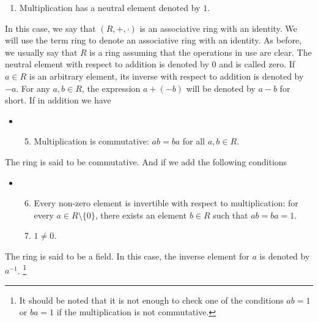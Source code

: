 \begin{definition}
\begin{itemize}
\begin{enumerate}
\item Multiplication has a neutral element denoted by $1$.
\end{enumerate}
\end{itemize}
In this case, we say that $(R, +, \cdot)$ is an associative ring with an identity.
We will use the term ring to denote an associative ring with an identity.
As before, we usually say that $R$ is a ring assuming that the operations in use are clear.
The neutral element with respect to addition is denoted by $0$ and is called zero.
If $a\in R$ is an arbitrary element, its inverse with respect to addition is denoted by $-a$.
For any $a, b\in R$, the expression $a + (-b)$ will be denoted by $a - b$ for short.
If in addition we have
\begin{itemize}
\item[]
\begin{enumerate}
\setcounter{enumi}{4}
\item Multiplication is commutative: $ab = ba$ for all $a, b\in R$.
\end{enumerate}
\end{itemize}
The ring is said to be commutative.
And if we add the following conditions
\begin{itemize}
\item[]
\begin{enumerate}
\setcounter{enumi}{5}
\item Every non-zero element is invertible with respect to multiplication: for every $a\in R\setminus\{0\}$, there exists an element $b\in R$ such that $ab = ba = 1$.

\item $1 \neq 0$.
\end{enumerate}
\end{itemize}
The ring is said to be a field.
In this case, the inverse element for $a$ is denoted by $a^{-1}$.%
\footnote{It should be noted that it is not enough to check one of the conditions $ab = 1$ or $ba = 1$ if the multiplication is not commutative.}
\end{definition}

